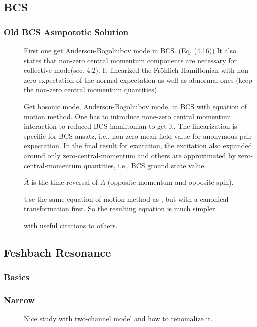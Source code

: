 \subsection{BCS}
\subsubsection{Old BCS Asmpototic Solution}
\begin{description}
 \item [\cite{BogoliubovColl}] First one get Anderson-Bogoliubov mode in BCS.  (Eq. (4.16))  It also states that non-zero central momentum components are necessary for collective mode(sec. 4.2).  It linearized the Fr\"{o}hlich Hamiltonian with non-zero expectation of the normal expectation as well as abnormal ones (keep the non-zero central momentum quantities). 
  \item [\cite{AndersonBCS}]Get bosonic mode, Anderson-Bogoliubov mode, in BCS with  equation of motion method.  One has to introduce none-zero central momentum interaction to reduced BCS hamiltonian to get it.  The linearization is specific for BCS ansatz, i.e., non-zero mean-field value for anonymous pair expectation. In the final result for excitation, the excitation also expanded around only zero-central-momentum and others are approximated by zero-central-momentum quantities, i.e., BCS ground state value. 
   
   $\bar{A}$ is the time reversal of $A$ (opposite momentum and opposite spin).
	 
\item[\cite{Rickayzen}] Use the same equation of motion method as \cite{AndersonBCS}, but with a canonical transformation first.  So the resulting equation is much simpler. 
\item[ \cite{BcsExact}] with useful citations to others.        
 \end{description}

\subsection{Feshbach Resonance}
\subsubsection{Basics}
\subsubsection{Narrow}
\begin{description}
  \item [\cite{JacksonNarrow}]Nice study with two-channel model and how to renomalize it. 
	
 \end{description}
